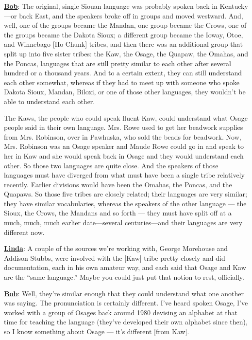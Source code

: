 \documentclass[output=paper]{LSP/langsci}
\begin{document}
\textbf{\underline{Bob}}: The original, single Siouan language was probably spoken back in Kentucky---or back East, and the speakers broke off in groups and moved westward. And, well, one of the groups became the Mandan, one group became the Crows, one of the groups became the Dakota Sioux; a different group became the Ioway, Otoe, and Winnebago [Ho-Chunk] tribes, and then there was an additional group that split up into five sister tribes: the Kaw, the Osage, the Quapaw, the Omahas, and the Poncas, languages that are still pretty similar to each other after several hundred or a thousand years. And to a certain extent, they can still understand each other somewhat, whereas if they had to meet up with someone who spoke Dakota Sioux, Mandan, Biloxi, or one of those other languages, they wouldn't be able to understand each other.

The Kaws, the people who could speak fluent Kaw, could understand what Osage people said in their own language. Mrs. Rowe used to get her beadwork supplies from Mrs. Robinson, over in Pawhuska, who sold the beads for beadwork. Now, Mrs. Robinson was an Osage speaker and Maude Rowe could go in and speak to her in Kaw and she would speak back in Osage and they would understand each other. So those two languages are quite close. And the speakers of those languages must have diverged from what must have been a single tribe relatively recently. Earlier divisions would have been the Omahas, the Poncas, and the Quapaws. So those five tribes are closely related; their languages are very similar; they have similar vocabularies, whereas the speakers of the other language --- the Sioux, the Crows, the Mandans and so forth --- they must have split off at a much, much, much earlier date---several centuries---and their languages are very different now.

\textbf{\underline{Linda}}: A couple of the sources we're working with, George Morehouse and Addison Stubbs, were involved with the [Kaw] tribe pretty closely and did documentation, each in his own amateur way, and each said that Osage and Kaw are the ``same language.'' Maybe you could just put that notion to rest, officially.

\textbf{\underline{Bob}}: Well, they're similar enough that they could understand what one another was saying. The pronunciation is certainly different. I've heard spoken Osage, I've worked with a group of Osages back around 1980 devising an alphabet at that time for teaching the language (they've developed their own alphabet since then), so I know something about Osage --- it's different [from Kaw].
\end{document}
